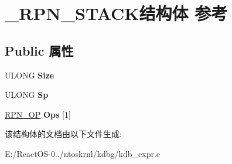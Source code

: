 \hypertarget{struct___r_p_n___s_t_a_c_k}{}\section{\+\_\+\+R\+P\+N\+\_\+\+S\+T\+A\+C\+K结构体 参考}
\label{struct___r_p_n___s_t_a_c_k}
\subsection*{Public 属性}
\begin{DoxyCompactItemize}
\item 
\mbox{\label{struct___r_p_n___s_t_a_c_k_a9e194081ee2c51d847bdf070f4ea9eaa}} 
U\+L\+O\+NG {\bfseries Size}
\item 
\mbox{\label{struct___r_p_n___s_t_a_c_k_ae53cf33bc531efd66eb2116f12a217b3}} 
U\+L\+O\+NG {\bfseries Sp}
\item 
\mbox{\label{struct___r_p_n___s_t_a_c_k_acf10c0d9b01cb7771aad6579324e72ee}} 
\hyperlink{struct___r_p_n___o_p}{R\+P\+N\+\_\+\+OP} {\bfseries Ops} \mbox{[}1\mbox{]}
\end{DoxyCompactItemize}


该结构体的文档由以下文件生成\+:\begin{DoxyCompactItemize}
\item 
E\+:/\+React\+O\+S-\/0../ntoskrnl/kdbg/kdb\+\_\+expr.\+c\end{DoxyCompactItemize}
